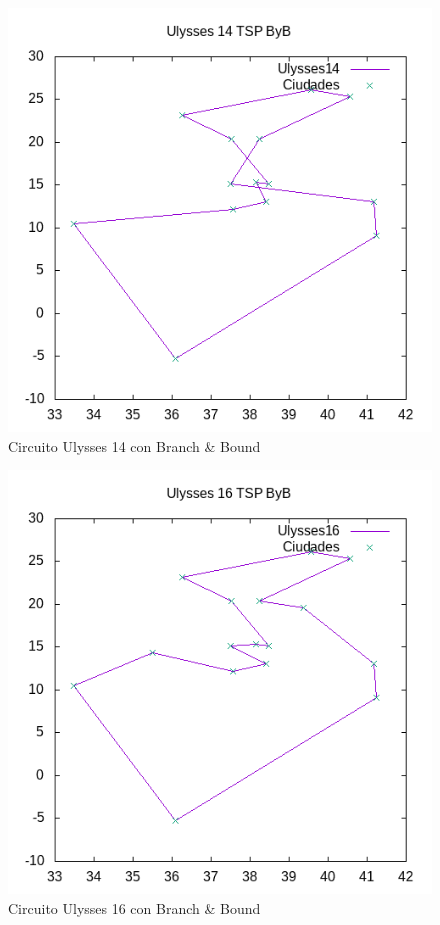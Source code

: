 \documentclass{article}
\begin{document}
	\begin{figure}[H]
		\centering
		\includegraphics[totalheight=6cm]{ulysses14byb}
		\caption{Circuito Ulysses 14 con Branch \& Bound}
		\label{fig:u14byb}
	\end{figure}

	\begin{figure}[H]
		\centering
		\includegraphics[totalheight=6cm]{ulysses16byb}
		\caption{Circuito Ulysses 16 con Branch \& Bound}
		\label{fig:u16byb}
	\end{figure}
\end{document}
